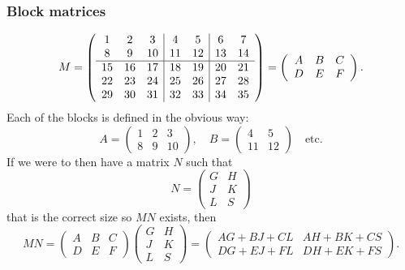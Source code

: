 \documentclass{article}
\begin{document}
\subsubsection{Block matrices}
\begin{equation}
    M = \left(\begin{array}{c c c|c c|c c}
        1 & 2 & 3 & 4 & 5 & 6 & 7 \\
        8 & 9 & 10 & 11 & 12 & 13 & 14 \\
        \hline
        15 & 16 & 17 & 18 & 19 & 20 & 21 \\
        22 & 23 & 24 & 25 & 26 & 27 & 28 \\
        29 & 30 & 31 & 32 & 33 & 34 & 35
    \end{array}\right)
    =
    \left(\begin{array}{c c c}
        A & B & C \\
        D & E & F
    \end{array}\right). \nonumber
\end{equation}
Each of the blocks is defined in the obvious way:
\begin{equation}
    A =
    \begin{pmatrix}
        1 & 2 & 3 \\ 8 & 9 & 10
    \end{pmatrix},\quad
    B =
    \begin{pmatrix}
        4 & 5 \\ 11 & 12
    \end{pmatrix}\quad\text{etc.} \nonumber
\end{equation}
If we were to then have a matrix $N$ such that 
\begin{equation}
    N = 
    \begin{pmatrix}
        G & H \\ J & K \\ L & S
    \end{pmatrix} \nonumber
\end{equation}
that is the correct size so $MN$ exists, then
\begin{equation}
    MN = 
    \begin{pmatrix}
        A & B & C \\ D & E & F
    \end{pmatrix}
    \begin{pmatrix}
        G & H \\ J & K \\ L & S
    \end{pmatrix}
    =
    \begin{pmatrix}
        AG + BJ + CL & AH + BK + CS \\ DG + EJ + FL & DH + EK + FS
    \end{pmatrix}.
\end{equation}
\end{document}
